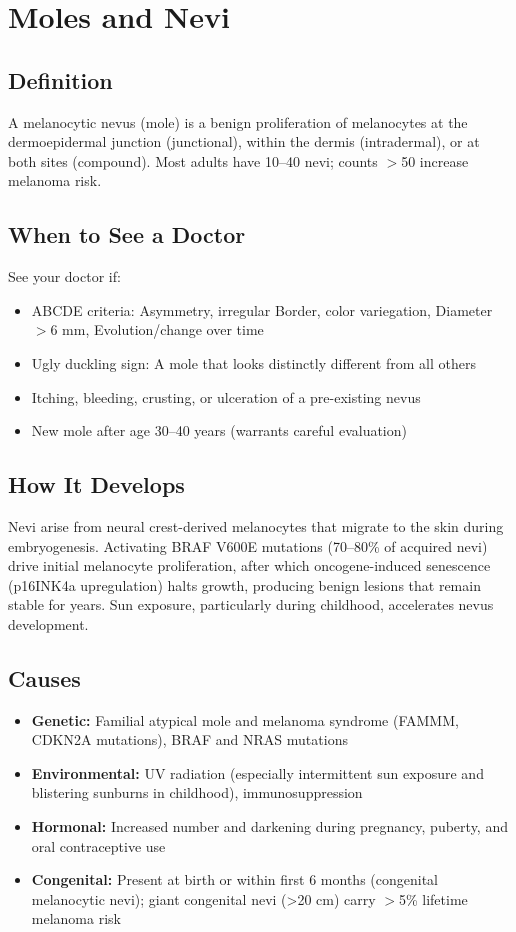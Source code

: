 \chapter{Moles and Nevi}

\section*{Definition}
A melanocytic nevus (mole) is a benign proliferation of melanocytes at the dermoepidermal junction (junctional), within the dermis (intradermal), or at both sites (compound). Most adults have 10--40 nevi; counts \ensuremath{>}50 increase melanoma risk.

\section*{When to See a Doctor}
See your doctor if:
\begin{itemize}
  \item ABCDE criteria: Asymmetry, irregular Border, color variegation, Diameter \ensuremath{>}6 mm, Evolution/change over time
  \item Ugly duckling sign: A mole that looks distinctly different from all others
  \item Itching, bleeding, crusting, or ulceration of a pre-existing nevus
  \item New mole after age 30--40 years (warrants careful evaluation)
\end{itemize}

\section*{How It Develops}
Nevi arise from neural crest-derived melanocytes that migrate to the skin during embryogenesis. Activating BRAF V600E mutations (70--80\% of acquired nevi) drive initial melanocyte proliferation, after which oncogene-induced senescence (p16INK4a upregulation) halts growth, producing benign lesions that remain stable for years. Sun exposure, particularly during childhood, accelerates nevus development.

\section*{Causes}
\begin{itemize}
  \item \textbf{Genetic:} Familial atypical mole and melanoma syndrome (FAMMM, CDKN2A mutations), BRAF and NRAS mutations
  \item \textbf{Environmental:} UV radiation (especially intermittent sun exposure and blistering sunburns in childhood), immunosuppression
  \item \textbf{Hormonal:} Increased number and darkening during pregnancy, puberty, and oral contraceptive use
  \item \textbf{Congenital:} Present at birth or within first 6 months (congenital melanocytic nevi); giant congenital nevi (>20 cm) carry \ensuremath{>}5\% lifetime melanoma risk
\end{itemize}

